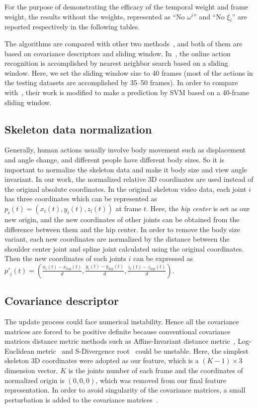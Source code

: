 \documentclass[sigconf]{acmart}
\begin{document}
For the purpose of demonstrating the efficacy of the temporal weight and frame weight, the results without the weights, represented as ``No $\omega^i$'' and ``No $\xi_i$'' are reported respectively in the following tables.

The algorithms are compared with other two methods~\cite{kviatkovsky2014online,hussein2013human}, and both of them are based on covariance descriptors and sliding window. In~\cite{kviatkovsky2014online}, the online action recognition is accomplished by nearest neighbor search based on a sliding window. Here, we set the sliding window size to 40 frames (most of the actions in the testing datasets are accomplished by 35--50 frames). In order to compare with~\cite{hussein2013human}, their work is modified to make a prediction by SVM based on a 40-frame sliding window.

\subsection{Skeleton data normalization}
\label{SkeletonNormalization}
Generally, human actions usually involve body movement such as displacement and angle change, and different people have different body sizes. So it is important to normalize the skeleton data and make it body size and view angle invariant. In our work, the normalized relative 3D coordinates are used instead of the original absolute coordinates. In the original skeleton video data, each joint $i$ has three coordinates which can be represented as ${p_i}\left( t \right) = \left( {{x_i}\left( t\right),{y_i}\left( t \right),{z_i}\left( t \right)} \right)$ at frame $t$. Here, the \emph{hip center} is set as our new origin, and the new coordinates of other joints can be obtained from the difference between them and the hip center. In order to remove the body size variant, each new coordinates are normalized by the distance between the shoulder center joint and spline joint calculated using the original coordinates. Then the new coordinates of each joints $i$ can be expressed as
${{p'}_i}\left( t \right) = \left(
{\frac{{{x_i}\left( t \right) - {x_{hip}}\left( t
\right)}}{d},\frac{{{y_i}\left( t \right) - {y_{hip}}\left( t
\right)}}{d},\frac{{{z_i}\left( t \right) - {z_{hip}}\left( t \right)}}{d}}
\right)$.

\subsection{Covariance descriptor}
\label{OurCovDes}
The update process could face numerical instability. Hence all the covariance matrices are forced to be positive definite because conventional covariance matrices distance metric methods such as Affine-Invariant distance metric~\cite{pennec2006riemannian}, Log-Euclidean metric~\cite{arsigny2007geometric} and S-Divergence root~\cite{srapositive} could be unstable. Here, the simplest skeleton 3D coordinates were adopted as our feature, which is a $(K-1) \times 3$ dimension vector. $K$ is the joints number of each frame and the coordinates of normalized origin is $(0,0,0)$, which was removed from our final feature representation. In order to avoid singularity of the covariance matrices, a small perturbation is added to the covariance matrices~\cite{wang2012covariance}.
\end{document}
